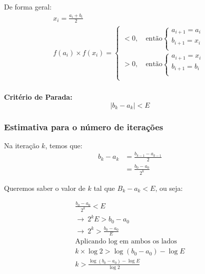 \documentclass{article}
\begin{document}
        De forma geral:
        \begin{gather*}
            x_i = \frac{a_i + b_i}{2}\\
            f(a_i) \times f(x_i) =
                \begin{cases}
                    < 0,~ & \text{então}
                        \begin{cases}
                            a_{i+1} = a_i\\
                            b_{i+1} = x_i\\
                        \end{cases}\\
                    > 0,~ & \text{então}
                        \begin{cases}
                            a_{i+1} = x_i\\
                            b_{i+1} = b_i\\
                        \end{cases}\\
                \end{cases}\\
        \end{gather*}

        \textbf{Critério de Parada:}
        \[|b_k - a_k| < E\]

        \subsubsection*{Estimativa para o número de iterações}
        Na iteração $k$, temos que:
        \begin{align*}
            b_k - a_k &= \frac{b_{k-1} - a_{k-1}}{2}\\
            &= \frac{b_0 - a_0}{2^k}
        \end{align*}

        Queremos saber o valor de $k$ tal que $B_k - a_k < E$, ou seja:

        \begin{gather*}
            \frac{b_0 - a_0}{2^k} < E\\
            \rightarrow~2^k E > b_0 - a_0\\
            \rightarrow~2^k > \frac{b_0 - a_0}{E}\\
            \text{Aplicando log em ambos os lados}\\
            k \times \log{2} > \log{(b_0 - a_0)} - \log{E}\\
            \boxed{k > \frac{\log{(b_0 - a_0)} - \log{E}}{\log{2}}}
        \end{gather*}
\end{document}
